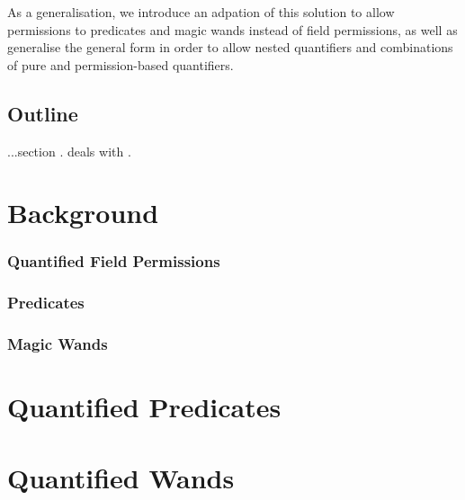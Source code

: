 \documentclass[12pt]{article}
\begin{document}
As a generalisation, we introduce an adpation of this solution to allow permissions to predicates\cite{predicates} and magic wands\cite{magicwand} instead of field permissions, as well as generalise the general form in order to allow nested quantifiers and combinations of pure and permission-based quantifiers.

\subsection{Outline}

...section . deals with .

\section{Background}
\subsubsection{Quantified Field Permissions}
\subsubsection{Predicates}
\subsubsection{Magic Wands}
\section{Quantified Predicates}
\section{Quantified Wands}
\end{document}
